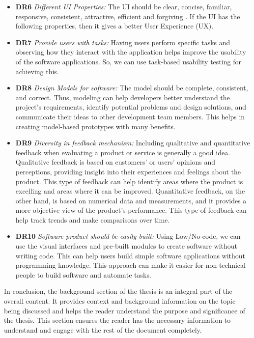 \begin{itemize}
  \item \textbf{DR6} \textit{Different UI Properties:} The UI should be clear, concise, familiar, responsive, consistent, attractive, efficient and forgiving \cite{article:prototyping:weichbroth}. If the UI has the following properties, then it gives a better User Experience (UX).
  \item \textbf{DR7} \textit{Provide users with tasks:} Having users perform specific tasks and observing how they interact with the application helps improve the usability of the software applications. So, we can use task-based usability testing for achieving this. 
  \item \textbf{DR8} \textit{Design Models for software:} The model should be complete, consistent, and correct. Thus, modeling can help developers better understand the project's requirements, identify potential problems and design solutions, and communicate their ideas to other development team members. This helps in creating model-based prototypes with many benefits.
  \item \textbf{DR9} \textit{Diversity in feedback mechanism:} Including qualitative and quantitative feedback when evaluating a product or service is generally a good idea. Qualitative feedback is based on customers' or users' opinions and perceptions, providing insight into their experiences and feelings about the product. This type of feedback can help identify areas where the product is excelling and areas where it can be improved. Quantitative feedback, on the other hand, is based on numerical data and measurements, and it provides a more objective view of the product's performance. This type of feedback can help track trends and make comparisons over time.
  \item \textbf{DR10} \textit{Software product should be easily built:} Using Low/No-code, we can use the visual interfaces and pre-built modules to create software without writing code. This can help users build simple software applications without programming knowledge. This approach can make it easier for non-technical people to build software and automate tasks.
\end{itemize}

In conclusion, the background section of the thesis is an integral part of the overall content. 
It provides context and background information on the topic being discussed and helps the reader understand the purpose and significance of the thesis. 
This section ensures the reader has the necessary information to understand and engage with the rest of the document completely.

